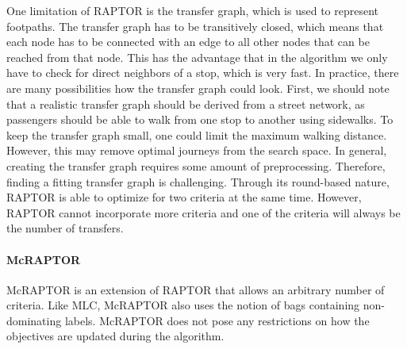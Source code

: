 One limitation of RAPTOR is the transfer graph, which is used to represent footpaths.
The transfer graph has to be transitively closed, which means that each node has to be connected with an edge to all other nodes that can be reached from that node.
This has the advantage that in the algorithm we only have to check for direct neighbors of a stop, which is very fast.
In practice, there are many possibilities how the transfer graph could look.
First, we should note that a realistic transfer graph should be derived from a street network, as passengers should be able to walk from one stop to another using sidewalks.
To keep the transfer graph small, one could limit the maximum walking distance.
However, this may remove optimal journeys from the search space.
In general, creating the transfer graph requires some amount of preprocessing.
Therefore, finding a fitting transfer graph is challenging.
Through its round-based nature, RAPTOR is able to optimize for two criteria at the same time.
However, RAPTOR cannot incorporate more criteria and one of the criteria will always be the number of transfers.


\paragraph{McRAPTOR}
\label{subsubsec:mcraptor}

McRAPTOR  is an extension of RAPTOR that allows an arbitrary number of criteria.
Like MLC, McRAPTOR also uses the notion of bags containing non-dominating labels.
McRAPTOR does not pose any restrictions on how the objectives are updated during the algorithm.

